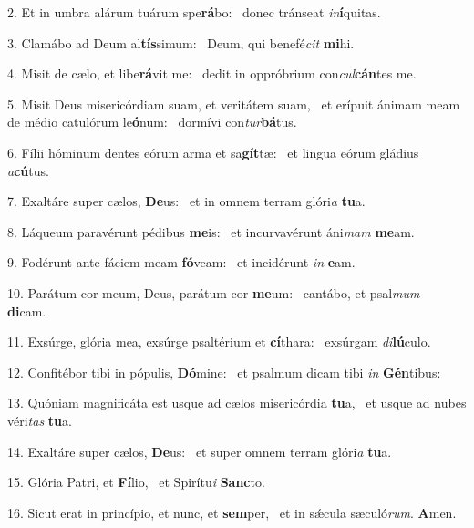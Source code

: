 2. Et in umbra alárum tuárum spe\textbf{rá}bo: \ast\  donec tránseat \textit{in}\textbf{í}quitas.\

3. Clamábo ad Deum al\textbf{tís}simum: \ast\  Deum, qui benefé\textit{cit} \textbf{mi}hi.\

4. Misit de cælo, et libe\textbf{rá}vit me: \ast\  dedit in oppróbrium con\textit{cul}\textbf{cán}tes me.\

5. Misit Deus misericórdiam suam, et veritátem suam, \dag\  et erípuit ánimam meam de médio catulórum le\textbf{ó}num: \ast\  dormívi con\textit{tur}\textbf{bá}tus.\

6. Fílii hóminum dentes eórum arma et sa\textbf{gít}tæ: \ast\  et lingua eórum gládius \textit{a}\textbf{cú}tus.\

7. Exaltáre super cælos, \textbf{De}us: \ast\  et in omnem terram glóri\textit{a} \textbf{tu}a.\

8. Láqueum paravérunt pédibus \textbf{me}is: \ast\  et incurvavérunt áni\textit{mam} \textbf{me}am.\

9. Fodérunt ante fáciem meam \textbf{fó}veam: \ast\  et incidérunt \textit{in} \textbf{e}am.\

10. Parátum cor meum, Deus, parátum cor \textbf{me}um: \ast\  cantábo, et psal\textit{mum} \textbf{di}cam.\

11. Exsúrge, glória mea, exsúrge psaltérium et \textbf{cí}thara: \ast\  exsúrgam \textit{di}\textbf{lú}culo.\

12. Confitébor tibi in pópulis, \textbf{Dó}mine: \ast\  et psalmum dicam tibi \textit{in} \textbf{Gén}tibus:\

13. Quóniam magnificáta est usque ad cælos misericórdia \textbf{tu}a, \ast\  et usque ad nubes véri\textit{tas} \textbf{tu}a.\

14. Exaltáre super cælos, \textbf{De}us: \ast\  et super omnem terram glóri\textit{a} \textbf{tu}a.\

15. Glória Patri, et \textbf{Fí}lio, \ast\  et Spirítu\textit{i} \textbf{Sanc}to.\

16. Sicut erat in princípio, et nunc, et \textbf{sem}per, \ast\  et in sǽcula sæculó\textit{rum}. \textbf{A}men.\

